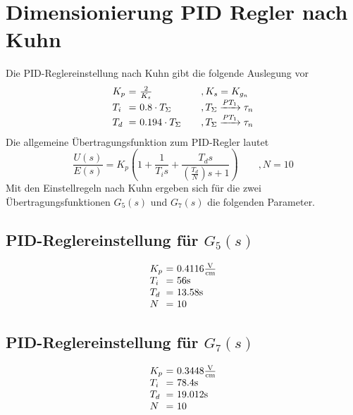 \section{Dimensionierung PID Regler nach Kuhn}
Die PID-Reglereinstellung nach Kuhn gibt die folgende Auslegung vor
\[
	\begin{array}{l@{~}c@{~}l@{\qquad}l}
        K_p & = & \frac{2}{K_s}         & ,K_s = K_{g_n} \\
        T_i & = & 0.8 \cdot T_\Sigma    & ,T_\Sigma \xrightarrow{PT_1} \tau_n \\
        T_d & = & 0.194 \cdot T_\Sigma  & ,T_\Sigma \xrightarrow{PT_1} \tau_n \\
	\end{array}
\]
Die allgemeine Übertragungsfunktion zum PID-Regler lautet
\[
	\frac{U(s)}{E(s)}
	= K_p \left(
		1 + \frac{1}{T_i s}
		+ \frac{T_d s}{\left(\frac{T_d}{N}\right)s + 1}
	\right)
	\qquad , N = 10
\]
Mit den Einstellregeln nach Kuhn ergeben sich für die zwei
Übertragungsfunktionen $G_5(s)$ und $G_7(s)$ die folgenden Parameter.

\subsection{PID-Reglereinstellung für $G_5(s)$}
\[
	\begin{array}{l@{~}c@{~}l}
		K_p & = & 0.4116 \si[per-mode = fraction]{\volt\per\cm} \\
		T_i & = & 56 \si{\second} \\
		T_d & = & 13.58 \si{\second} \\
		N & = & 10
	\end{array}
\]

\subsection{PID-Reglereinstellung für $G_7(s)$}
\[
	\begin{array}{l@{~}c@{~}l}
		K_p & = & 0.3448 \si[per-mode = fraction]{\volt\per\cm} \\
		T_i & = & 78.4 \si{\second} \\
		T_d & = & 19.012 \si{\second} \\
		N & = & 10
	\end{array}
\]
